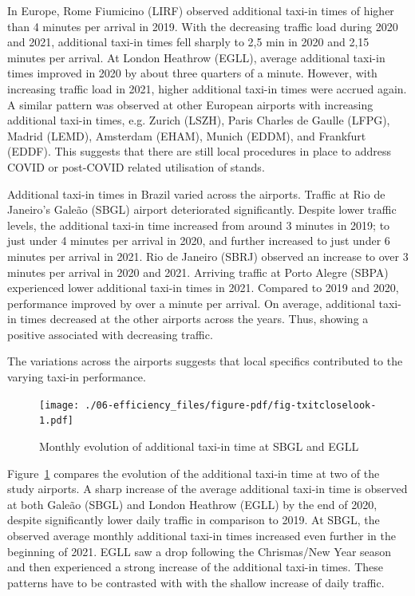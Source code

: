 \documentclass[
  a4paper,
  DIV=11,
  numbers=noendperiod]{scrreprt}
\begin{document}
In Europe, Rome Fiumicino (LIRF) observed additional taxi-in times of
higher than 4 minutes per arrival in 2019. With the decreasing traffic
load during 2020 and 2021, additional taxi-in times fell sharply to 2,5
min in 2020 and 2,15 minutes per arrival. At London Heathrow (EGLL),
average additional taxi-in times improved in 2020 by about three
quarters of a minute. However, with increasing traffic load in 2021,
higher additional taxi-in times were accrued again. A similar pattern
was observed at other European airports with increasing additional
taxi-in times, e.g. Zurich (LSZH), Paris Charles de Gaulle (LFPG),
Madrid (LEMD), Amsterdam (EHAM), Munich (EDDM), and Frankfurt (EDDF).
This suggests that there are still local procedures in place to address
COVID or post-COVID related utilisation of stands.

Additional taxi-in times in Brazil varied across the airports. Traffic
at Rio de Janeiro's Galeão (SBGL) airport deteriorated significantly.
Despite lower traffic levels, the additional taxi-in time increased from
around 3 minutes in 2019; to just under 4 minutes per arrival in 2020,
and further increased to just under 6 minutes per arrival in 2021. Rio
de Janeiro (SBRJ) observed an increase to over 3 minutes per arrival in
2020 and 2021. Arriving traffic at Porto Alegre (SBPA) experienced lower
additional taxi-in times in 2021. Compared to 2019 and 2020, performance
improved by over a minute per arrival. On average, additional taxi-in
times decreased at the other airports across the years. Thus, showing a
positive associated with decreasing traffic.

The variations across the airports suggests that local specifics
contributed to the varying taxi-in performance.

\begin{figure}[h]

{\centering \texttt{[image: ./06-efficiency\_files/figure-pdf/fig-txitcloselook-1.pdf]}

}

\caption{\label{fig-txitcloselook}Monthly evolution of additional
taxi-in time at SBGL and EGLL}

\end{figure}

Figure~\ref{fig-txitcloselook} compares the evolution of the additional
taxi-in time at two of the study airports. A sharp increase of the
average additional taxi-in time is observed at both Galeão (SBGL) and
London Heathrow (EGLL) by the end of 2020, despite significantly lower
daily traffic in comparison to 2019. At SBGL, the observed average
monthly additional taxi-in times increased even further in the beginning
of 2021. EGLL saw a drop following the Chrismas/New Year season and then
experienced a strong increase of the additional taxi-in times. These
patterns have to be contrasted with with the shallow increase of daily
traffic.
\end{document}
